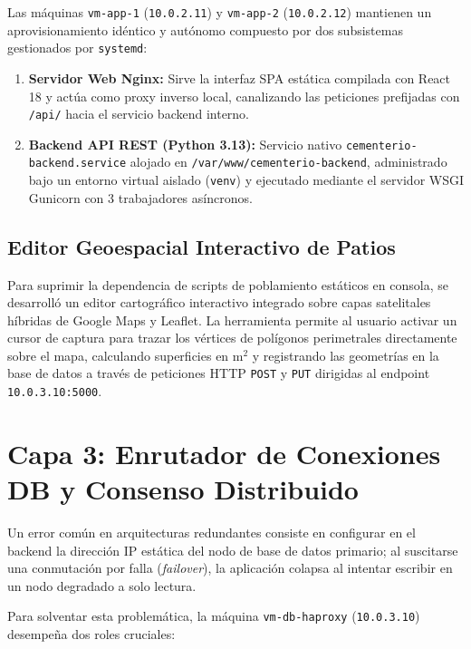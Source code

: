 \documentclass[12pt]{article}
\begin{document}
Las máquinas \texttt{vm-app-1} (\texttt{10.0.2.11}) y \texttt{vm-app-2} (\texttt{10.0.2.12}) mantienen un aprovisionamiento idéntico y autónomo compuesto por dos subsistemas gestionados por \texttt{systemd}:

\begin{enumerate}
    \item \textbf{Servidor Web Nginx:} Sirve la interfaz SPA estática compilada con React 18 y actúa como proxy inverso local, canalizando las peticiones prefijadas con \texttt{/api/} hacia el servicio backend interno.
    \item \textbf{Backend API REST (Python 3.13):} Servicio nativo \texttt{cementerio-backend.service} alojado en \texttt{/var/www/cementerio-backend}, administrado bajo un entorno virtual aislado (\texttt{venv}) y ejecutado mediante el servidor WSGI Gunicorn con 3 trabajadores asíncronos.
\end{enumerate}

\subsection{Editor Geoespacial Interactivo de Patios}
Para suprimir la dependencia de scripts de poblamiento estáticos en consola, se desarrolló un editor cartográfico interactivo integrado sobre capas satelitales híbridas de Google Maps y Leaflet. La herramienta permite al usuario activar un cursor de captura para trazar los vértices de polígonos perimetrales directamente sobre el mapa, calculando superficies en $\text{m}^2$ y registrando las geometrías en la base de datos a través de peticiones HTTP \texttt{POST} y \texttt{PUT} dirigidas al endpoint \texttt{10.0.3.10:5000}.


\section{Capa 3: Enrutador de Conexiones DB y Consenso Distribuido}

Un error común en arquitecturas redundantes consiste en configurar en el backend la dirección IP estática del nodo de base de datos primario; al suscitarse una conmutación por falla (\textit{failover}), la aplicación colapsa al intentar escribir en un nodo degradado a solo lectura.

Para solventar esta problemática, la máquina \texttt{vm-db-haproxy} (\texttt{10.0.3.10}) desempeña dos roles cruciales:
\end{document}
